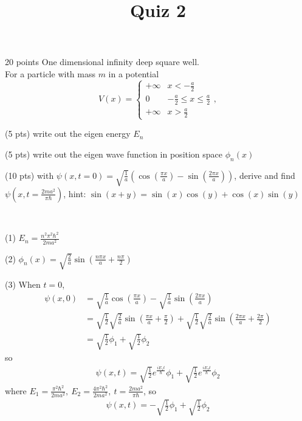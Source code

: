 \documentclass[UTF8,12pt]{article} %
\makeatletter
\newenvironment{proof}[1][\protect\proofname]{\par
\normalfont\topsep6\p@\@plus6\p@\relax
\trivlist
\itemindent\parindent
\item[\hskip\labelsep
\scshape
#1]\ignorespaces
}{%
\endtrivlist\@endpefalse
}
\renewcommand{\proofname}{\it{Solution}}
\makeatother
\begin{document}
\title{Quiz 2}
\date{} %
\maketitle

\begin{exercise}{20 points}{}
One dimensional infinity deep square well.\\
For a particle with mass $m$ in a potential 
$$V(x) = \begin{cases}+\infty & x<-\frac{a}{2 }\\ 0 & -\frac{a}{2}\le x\le \frac{a}{2} \\ +\infty & x>\frac{a}{2}\end{cases},$$
\begin{enumerate*}
\item (5 pts) write out the eigen energy $E_{n}$
\item (5 pts) write out the eigen wave function in position space $\phi_{n}(x)$
\item (10 pts) with $\psi(x,t=0) = \sqrt{\frac{1}{a}}\left(\cos\left(\frac{\pi x}{a}\right) - \sin\left(\frac{2\pi x}{a}\right)\right)$, derive and find $\psi(x, t = \frac{2ma^{2}}{\pi \hbar})$, hint: $\sin(x+y) = \sin(x)\cos(y) + \cos(x)\sin(y)$
\end{enumerate*}
\end{exercise}

\begin{proof}[Solution]~\par
(1) $E_{n} = \frac{n^{2}\pi^{2}\hbar^{2}}{2ma^{2}}$\par
(2) $\phi_{n}(x) = \sqrt{\frac{2}{a}}\sin\left(\frac{n\pi x}{a} + \frac{n\pi}{2}\right)$\par
(3) When $t = 0$,
\begin{align}
\psi(x,0) &= \sqrt{\frac{1}{a}}\cos\left(\frac{\pi x}{a}\right) - \sqrt{\frac{1}{a}}\sin\left(\frac{2\pi x}{a}\right) \\
&= \sqrt{\frac{1}{2}}\sqrt{\frac{2}{a}}\sin\left(\frac{\pi x}{a} + \frac{\pi}{2}\right) + \sqrt{\frac{1}{2}}\sqrt{\frac{2}{a}}\sin\left(\frac{2\pi x}{a} + \frac{2\pi}{2}\right) \\
&= \sqrt{\frac{1}{2}}\phi_{1} + \sqrt{\frac{1}{2}}\phi_{2}
\end{align}
so
\begin{align}
\psi(x,t) = \sqrt{\frac{1}{2}}e^{\frac{iE_{1}t}{\hbar}}\phi_{1} + \sqrt{\frac{1}{2}}e^{\frac{iE_{2}t}{\hbar}}\phi_{2}
\end{align}
where $E_{1} = \frac{\pi^{2}\hbar^{2}}{2ma^{2}},~ E_{2} = \frac{4\pi^{2}\hbar^{2}}{2ma^{2}},~ t = \frac{2ma^{2}}{\pi\hbar}$, so
\begin{align}
\psi(x,t) = -\sqrt{\frac{1}{2}}\phi_{1} + \sqrt{\frac{1}{2}}\phi_{2}
\end{align}
\end{proof}
\end{document}
